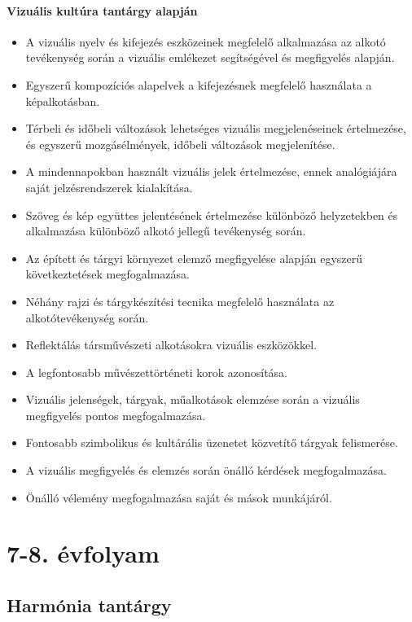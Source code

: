 \paragraph{Vizuális kultúra tantárgy alapján}
\begin{itemize}
\item A vizuális nyelv és kifejezés eszközeinek megfelelő alkalmazása az alkotó tevékenység során a vizuális emlékezet segítségével és megfigyelés alapján.
\item Egyszerű kompozíciós alapelvek a kifejezésnek megfelelő használata a képalkotásban.
\item Térbeli és időbeli változások lehetséges vizuális megjelenéseinek értelmezése, és egyszerű mozgásélmények, időbeli változások megjelenítése.
\item A mindennapokban használt vizuális jelek értelmezése, ennek analógiájára saját jelzésrendszerek kialakítása.
\item Szöveg és kép együttes jelentésének értelmezése különböző helyzetekben és alkalmazása különböző alkotó jellegű tevékenység során.
\item Az épített és tárgyi környezet elemző megfigyelése alapján egyszerű következtetések megfogalmazása.
\item Néhány rajzi és tárgykészítési tecnika megfelelő használata az alkotótevékenység során.
\item Reflektálás társművészeti alkotásokra vizuális eszközökkel.
\item A legfontosabb művészettörténeti korok azonosítása.
\item Vizuális jelenségek, tárgyak, műalkotások elemzése során a vizuális megfigyelés pontos megfogalmazása.
\item Fontosabb szimbolikus és kultárális üzenetet közvetítő tárgyak felismerése.
\item A vizuális megfigyelés és elemzés során önálló kérdések megfogalmazása.
\item Önálló vélemény megfogalmazása saját és mások munkájáról.
\end{itemize}
\section{7-8. évfolyam}
\subsection{Harmónia tantárgy}

